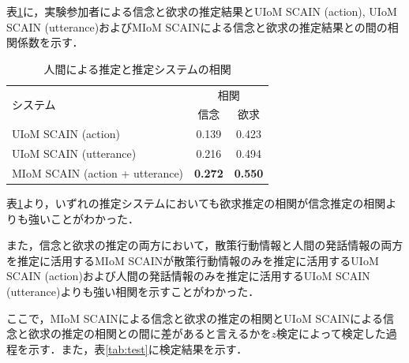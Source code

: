 \par
表\ref{tab:cof}に，実験参加者による信念と欲求の推定結果とUIoM SCAIN (action), UIoM SCAIN (utterance)およびMIoM SCAINによる信念と欲求の推定結果との間の相関係数を示す．
\begin{table}[htb]
  \begin{center}
  \caption{人間による推定と推定システムの相関}
  \label{tab:cof}
  \begin{tabular}{lcc} \hline
    \multirow{2}{*}{システム}&\multicolumn{2}{c}{相関}\\\cline{2-3}
    & \hspace{10pt} 信念 \hspace{10pt} & \hspace{10pt} 欲求 \hspace{10pt} \\ \hline
    UIoM SCAIN (action)&0.139&0.423\\
    UIoM SCAIN (utterance)&0.216&0.494\\
    MIoM SCAIN (action + utterance)&\bf0.272&\bf0.550 \\\hline
  \end{tabular}
\end{center}
\end{table}

\par
表\ref{tab:cof}より，いずれの推定システムにおいても欲求推定の相関が信念推定の相関よりも強いことがわかった．

\par
また，信念と欲求の推定の両方において，散策行動情報と人間の発話情報の両方を推定に活用するMIoM SCAINが散策行動情報のみを推定に活用するUIoM SCAIN (action)および人間の発話情報のみを推定に活用するUIoM SCAIN (utterance)よりも強い相関を示すことがわかった．

\par
ここで，MIoM SCAINによる信念と欲求の推定の相関とUIoM SCAINによる信念と欲求の推定の相関との間に差があると言えるかを$z$検定\cite{alma9926301497204034}によって検定した過程を示す．また，表\ref{tab:test}に検定結果を示す．

